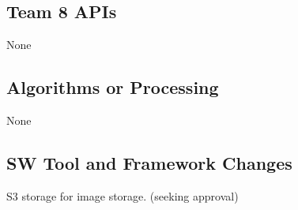 \subsection{Team 8 APIs}
None

\subsection{Algorithms or Processing}
None

\subsection{SW Tool and Framework Changes}
S3 storage for image storage. (seeking approval)
